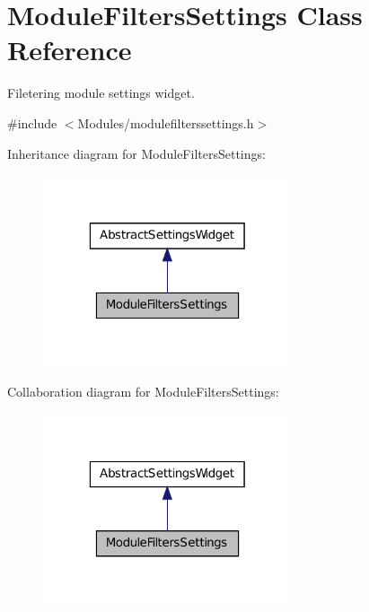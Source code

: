 \hypertarget{class_module_filters_settings}{
\section{ModuleFiltersSettings Class Reference}
\label{d0/d0f/class_module_filters_settings}
}


Filetering module settings widget.  




{\ttfamily \#include $<$Modules/modulefilterssettings.h$>$}



Inheritance diagram for ModuleFiltersSettings:\nopagebreak
\begin{figure}[H]
\begin{center}
\leavevmode
\includegraphics[width=208pt]{dc/de1/class_module_filters_settings__inherit__graph}
\end{center}
\end{figure}


Collaboration diagram for ModuleFiltersSettings:\nopagebreak
\begin{figure}[H]
\begin{center}
\leavevmode
\includegraphics[width=208pt]{d2/d48/class_module_filters_settings__coll__graph}
\end{center}
\end{figure}
